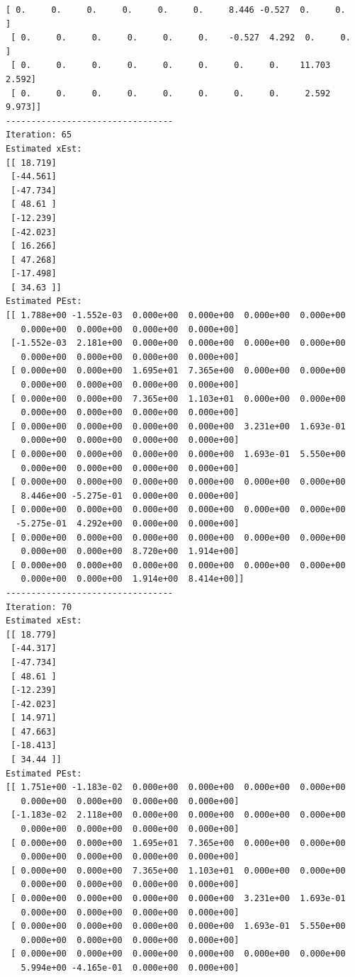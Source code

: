 \documentclass[11pt]{article}
\begin{document}
\begin{Verbatim}[commandchars=\\\{\}]
 [ 0.     0.     0.     0.     0.     0.     8.446 -0.527  0.     0.   ]
 [ 0.     0.     0.     0.     0.     0.    -0.527  4.292  0.     0.   ]
 [ 0.     0.     0.     0.     0.     0.     0.     0.    11.703  2.592]
 [ 0.     0.     0.     0.     0.     0.     0.     0.     2.592  9.973]]
---------------------------------
Iteration: 65
Estimated xEst:
[[ 18.719]
 [-44.561]
 [-47.734]
 [ 48.61 ]
 [-12.239]
 [-42.023]
 [ 16.266]
 [ 47.268]
 [-17.498]
 [ 34.63 ]]
Estimated PEst:
[[ 1.788e+00 -1.552e-03  0.000e+00  0.000e+00  0.000e+00  0.000e+00
   0.000e+00  0.000e+00  0.000e+00  0.000e+00]
 [-1.552e-03  2.181e+00  0.000e+00  0.000e+00  0.000e+00  0.000e+00
   0.000e+00  0.000e+00  0.000e+00  0.000e+00]
 [ 0.000e+00  0.000e+00  1.695e+01  7.365e+00  0.000e+00  0.000e+00
   0.000e+00  0.000e+00  0.000e+00  0.000e+00]
 [ 0.000e+00  0.000e+00  7.365e+00  1.103e+01  0.000e+00  0.000e+00
   0.000e+00  0.000e+00  0.000e+00  0.000e+00]
 [ 0.000e+00  0.000e+00  0.000e+00  0.000e+00  3.231e+00  1.693e-01
   0.000e+00  0.000e+00  0.000e+00  0.000e+00]
 [ 0.000e+00  0.000e+00  0.000e+00  0.000e+00  1.693e-01  5.550e+00
   0.000e+00  0.000e+00  0.000e+00  0.000e+00]
 [ 0.000e+00  0.000e+00  0.000e+00  0.000e+00  0.000e+00  0.000e+00
   8.446e+00 -5.275e-01  0.000e+00  0.000e+00]
 [ 0.000e+00  0.000e+00  0.000e+00  0.000e+00  0.000e+00  0.000e+00
  -5.275e-01  4.292e+00  0.000e+00  0.000e+00]
 [ 0.000e+00  0.000e+00  0.000e+00  0.000e+00  0.000e+00  0.000e+00
   0.000e+00  0.000e+00  8.720e+00  1.914e+00]
 [ 0.000e+00  0.000e+00  0.000e+00  0.000e+00  0.000e+00  0.000e+00
   0.000e+00  0.000e+00  1.914e+00  8.414e+00]]
---------------------------------
Iteration: 70
Estimated xEst:
[[ 18.779]
 [-44.317]
 [-47.734]
 [ 48.61 ]
 [-12.239]
 [-42.023]
 [ 14.971]
 [ 47.663]
 [-18.413]
 [ 34.44 ]]
Estimated PEst:
[[ 1.751e+00 -1.183e-02  0.000e+00  0.000e+00  0.000e+00  0.000e+00
   0.000e+00  0.000e+00  0.000e+00  0.000e+00]
 [-1.183e-02  2.118e+00  0.000e+00  0.000e+00  0.000e+00  0.000e+00
   0.000e+00  0.000e+00  0.000e+00  0.000e+00]
 [ 0.000e+00  0.000e+00  1.695e+01  7.365e+00  0.000e+00  0.000e+00
   0.000e+00  0.000e+00  0.000e+00  0.000e+00]
 [ 0.000e+00  0.000e+00  7.365e+00  1.103e+01  0.000e+00  0.000e+00
   0.000e+00  0.000e+00  0.000e+00  0.000e+00]
 [ 0.000e+00  0.000e+00  0.000e+00  0.000e+00  3.231e+00  1.693e-01
   0.000e+00  0.000e+00  0.000e+00  0.000e+00]
 [ 0.000e+00  0.000e+00  0.000e+00  0.000e+00  1.693e-01  5.550e+00
   0.000e+00  0.000e+00  0.000e+00  0.000e+00]
 [ 0.000e+00  0.000e+00  0.000e+00  0.000e+00  0.000e+00  0.000e+00
   5.994e+00 -4.165e-01  0.000e+00  0.000e+00]

\end{Verbatim}
\end{document}
